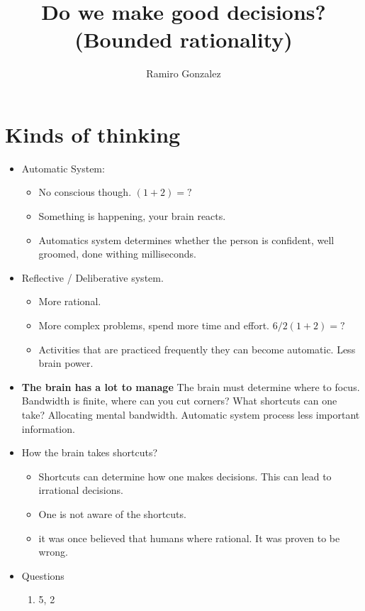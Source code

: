 \documentclass{article}
\title{Do we make good decisions? (Bounded rationality)}
\author{Ramiro Gonzalez }
\date{}
\begin{document}
\maketitle

\section*{Kinds of thinking}
\begin{itemize}
    \item Automatic System: 
    \begin{itemize}
        \item No conscious though.  $(1 + 2) = ?$ 
        \item Something is happening, your brain reacts. 
        \item Automatics system determines whether the person is confident, well groomed, done withing milliseconds. 
    \end{itemize}
    \item Reflective / Deliberative system. 
    \begin{itemize}
        \item More rational. 
        \item More complex problems, spend more time and effort. $6/2(1+2)=?$
        \item Activities that are practiced frequently they can become automatic. Less brain power. 
    \end{itemize}
    \item \textbf{The brain has a lot to manage} The brain must determine where to focus. Bandwidth is finite, where can you cut corners? What shortcuts can one take? Allocating mental bandwidth. Automatic system process less important information. 
    \item How the brain takes shortcuts?
    \begin{itemize}
        \item Shortcuts can determine how one makes decisions. This can lead to irrational decisions. 
        \item One is not aware of the shortcuts. 
        \item it was once believed that humans where rational. It was proven to be wrong. 
    \end{itemize}
    \item Questions
    \begin{enumerate}
        \item 5, 2
    \end{enumerate}
\end{itemize}
\end{document}
